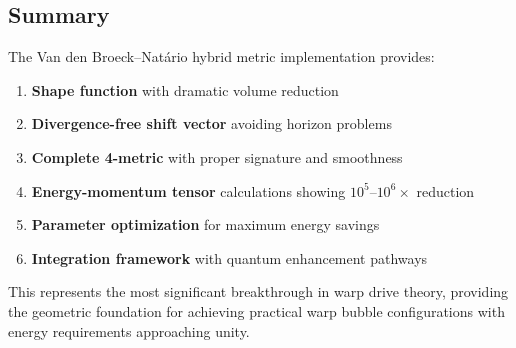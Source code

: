 \subsection{Summary}

The Van den Broeck–Natário hybrid metric implementation provides:

\begin{enumerate}
\item \textbf{Shape function} with dramatic volume reduction
\item \textbf{Divergence-free shift vector} avoiding horizon problems
\item \textbf{Complete 4-metric} with proper signature and smoothness
\item \textbf{Energy-momentum tensor} calculations showing $10^5$--$10^6\times$ reduction
\item \textbf{Parameter optimization} for maximum energy savings
\item \textbf{Integration framework} with quantum enhancement pathways
\end{enumerate}

This represents the most significant breakthrough in warp drive theory, providing the geometric foundation for achieving practical warp bubble configurations with energy requirements approaching unity.
